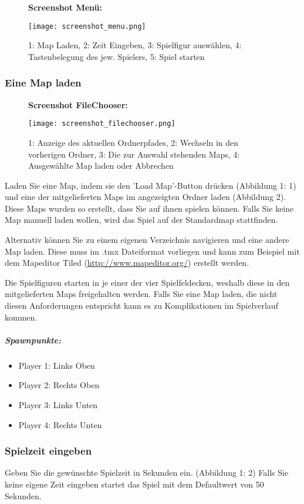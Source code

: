\documentclass[a4paper]{scrartcl}
\begin{document}
\begin{figure}[H]
  \textbf{Screenshot Menü:}\par\medskip
  \centering
\texttt{[image: screenshot\_menu.png]}
\caption{1: Map Laden, 2: Zeit Eingeben, 3: Spielfigur auswählen, 4: Tastenbelegung des jew. Spielers,
5: Spiel starten}
\end{figure}



\subsubsection{Eine Map laden}
\begin{figure}[H]
  \textbf{Screenshot FileChooser:}\par\medskip
  \centering
\texttt{[image: screenshot\_filechooser.png]}  
\caption{1: Anzeige des aktuellen Ordnerpfades, 2: Wechseln in den vorherigen Ordner, 3: Die zur Auswahl stehenden Maps, 4: Ausgewählte Map laden oder Abbrechen}
\end{figure}
 
Laden Sie eine Map, indem sie den 'Load Map'-Button drücken (Abbildung 1: 1) und eine der mitgelieferten Maps im angezeigten Ordner laden (Abbildung 2). Diese Maps wurden so erstellt, dass Sie auf ihnen spielen können. Falls Sie keine Map manuell laden wollen, wird das Spiel auf der Standardmap stattfinden.


Alternativ können Sie zu einem eigenen Verzeichnis navigieren und eine andere Map laden. Diese muss im .tmx Dateiformat vorliegen und kann zum Beispiel mit dem Mapeditor Tiled (\url{http://www.mapeditor.org/}) erstellt werden. 

Die Spielfiguren starten in je einer der vier Spielfeldecken, weshalb diese in den mitgelieferten Maps freigehalten werden. Falls Sie eine Map laden, die nicht diesen Anforderungen entspricht kann es zu Komplikationen im Spielverlauf kommen.
\subparagraph{Spawnpunkte:}
\begin{itemize}
\item Player 1: Links Oben
\item Player 2: Rechts Oben
\item Player 3: Links Unten
\item Player 4: Rechts Unten
\end{itemize}

\subsubsection{Spielzeit eingeben}
Geben Sie die gewünschte Spielzeit in Sekunden ein. (Abbildung 1: 2) Falls Sie keine eigene Zeit eingeben startet das Spiel mit dem Defaultwert von 50 Sekunden. 
\end{document}
